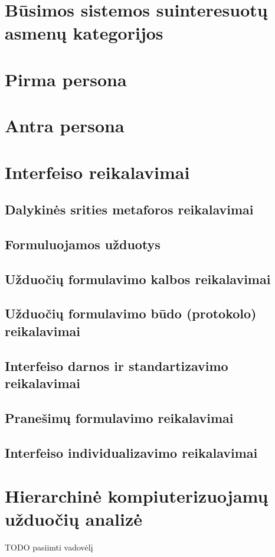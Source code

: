 
\section{Būsimos sistemos suinteresuotų asmenų kategorijos}

\section{Pirma persona}

\section{Antra persona}

\section{Interfeiso reikalavimai}
\subsection{Dalykinės srities metaforos reikalavimai}
\subsection{Formuluojamos užduotys}
\subsection{Užduočių formulavimo kalbos reikalavimai}
\subsection{Užduočių formulavimo būdo (protokolo) reikalavimai}
\subsection{Interfeiso darnos ir standartizavimo reikalavimai}
\subsection{Pranešimų formulavimo reikalavimai}
\subsection{Interfeiso individualizavimo reikalavimai}

\section{Hierarchinė kompiuterizuojamų užduočių analizė}
TODO pasiimti vadovėlį